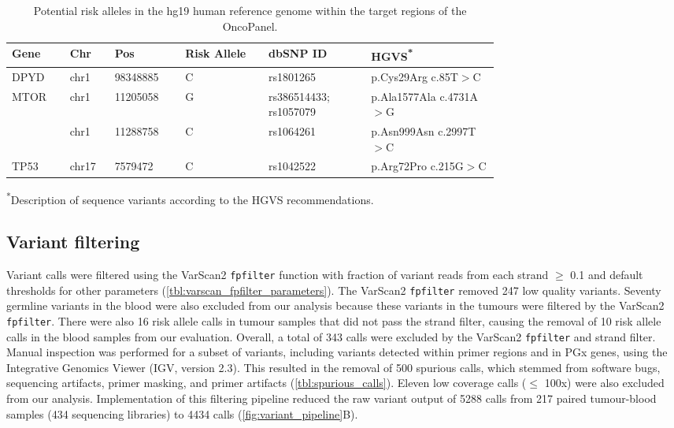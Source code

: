 \begin{longtable}{p{0.08\linewidth}|p{0.05\linewidth}p{0.1\linewidth}p{0.13\linewidth}p{0.16\linewidth}p{0.2\linewidth}}
    \caption{Potential risk alleles in the hg19 human reference genome within the target regions of the OncoPanel.}
    \label{tbl:potential_risk_alleles}
        \\
        \hline
        Gene & Chr & Pos & Risk Allele & dbSNP ID & HGVS\textsuperscript{*}
				\\
				\hline
        DPYD & chr1 & 98348885 & C & rs1801265 & p.Cys29Arg c.85T$>$C
        \\
        MTOR & chr1 & 11205058 & G & rs386514433; rs1057079 & p.Ala1577Ala c.4731A$>$G
        \\
        & chr1 & 11288758 & C & rs1064261 & p.Asn999Asn c.2997T$>$C
        \\
        TP53 & chr17 & 7579472 & C & rs1042522 & p.Arg72Pro c.215G$>$C
        \\
				\hline
\end{longtable}
\textsuperscript{*}Description of sequence variants according to the HGVS recommendations.


\subsection{Variant filtering}

Variant calls were filtered using the VarScan2 \texttt{fpfilter} function with fraction of variant reads from each strand $\geq$ 0.1 and default thresholds for other parameters (\autoref{tbl:varscan_fpfilter_parameters}). The VarScan2 \texttt{fpfilter} removed 247 low quality variants. Seventy germline variants in the blood were also excluded from our analysis because these variants in the tumours were filtered by the VarScan2 \texttt{fpfilter}. There were also 16 risk allele calls in tumour samples that did not pass the strand filter, causing the removal of 10 risk allele calls in the blood samples from our evaluation. Overall, a total of 343 calls were excluded by the VarScan2 \texttt{fpfilter} and strand filter. Manual inspection was performed for a subset of variants, including variants detected within primer regions and in PGx genes, using the Integrative Genomics Viewer (IGV, version 2.3). This resulted in the removal of 500 spurious calls, which stemmed from software bugs, sequencing artifacts, primer masking, and primer artifacts (\autoref{tbl:spurious_calls}). Eleven low coverage calls ($\leq$ 100x) were also excluded from our analysis. Implementation of this filtering pipeline reduced the raw variant output of 5288 calls from 217 paired tumour-blood samples (434 sequencing libraries) to 4434 calls (\autoref{fig:variant_pipeline}B).

